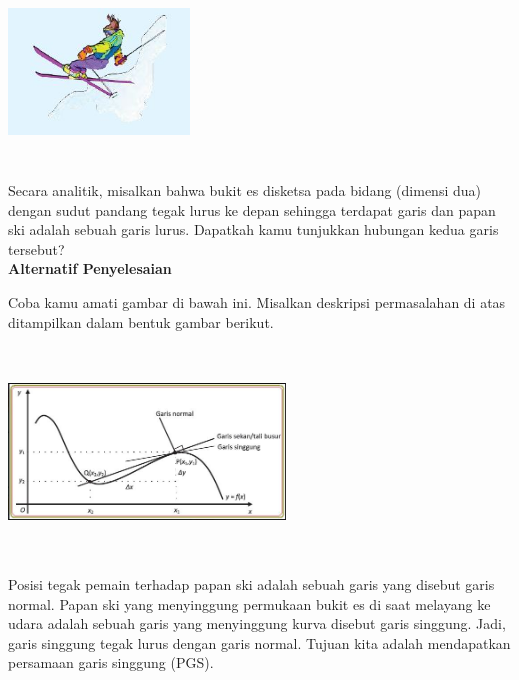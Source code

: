\documentclass[11pt,fleqn]{book} %
\begin{document}
\noindent
\begin{center}
\noindent \includegraphics*[width=1.90in, height=1.90in, keepaspectratio=false, trim=0.00in 0.11in 0.00in 0.00in]{Pictures/TurunanFungsi1.JPG}\\
\end{center}

\noindent 
Secara analitik, misalkan bahwa bukit es disketsa pada bidang (dimensi dua) dengan sudut pandang tegak lurus ke depan sehingga terdapat garis dan papan ski adalah sebuah garis lurus. Dapatkah kamu tunjukkan hubungan kedua garis tersebut?\\

\noindent 
\textbf{Alternatif Penyelesaian}

\noindent 
Coba kamu amati gambar di bawah ini. Misalkan deskripsi permasalahan di atas ditampilkan dalam bentuk gambar berikut. 

\noindent
\begin{center}
\noindent \includegraphics*[width=2.90in, height=2.19in, keepaspectratio=false, trim=0.00in 0.11in 0.00in 0.00in]{Pictures/TurunanFungsi2.JPG}
\end{center}

\noindent 
Posisi tegak pemain terhadap papan ski adalah sebuah garis yang disebut garis normal. Papan ski yang menyinggung permukaan bukit es di saat melayang ke udara adalah sebuah garis yang menyinggung kurva disebut garis singgung. Jadi, garis singgung tegak lurus dengan garis normal. Tujuan kita adalah mendapatkan persamaan garis singgung (PGS).
\end{document}
